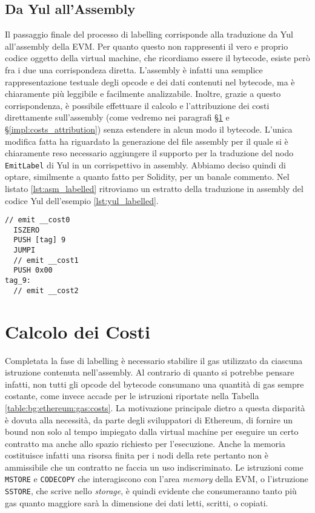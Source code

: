 \documentclass[12pt,a4paper,openright,oneside]{report}
\theoremstyle{definition}
\begin{document}
\subsection{Da Yul all'Assembly}\label{impl:lbl:evm}
Il passaggio finale del processo di labelling corrisponde alla traduzione da Yul all'assembly della EVM. Per quanto questo non rappresenti il vero e proprio codice oggetto della virtual machine, che ricordiamo essere il bytecode, esiste per\`{o} fra i due una corrispondeza diretta. L'assembly \`{e} infatti una semplice rappresentazione testuale degli opcode e dei dati contenuti nel bytecode, ma \`{e} chiaramente pi\`{u} leggibile e facilmente analizzabile. Inoltre, grazie a questo corrispondenza, \`{e} possibile effettuare il calcolo e l'attribuzione dei costi direttamente sull'assembly (come vedremo nei paragrafi \S\ref{impl:costs_calculation} e \S\ref{impl:costs_attribution}) senza estendere in alcun modo il bytecode. L'unica modifica fatta ha riguardato la generazione del file assembly per il quale si \`{e} chiaramente reso necessario aggiungere il supporto per la traduzione del nodo \texttt{EmitLabel} di Yul in un corrispettivo in assembly. Abbiamo deciso quindi di optare, similmente a quanto fatto per Solidity, per un banale commento. Nel listato \ref{lst:asm_labelled} ritroviamo un estratto della traduzione in assembly del codice Yul dell'esempio \ref{lst:yul_labelled}. 
\begin{lstlisting}[caption=Esempio di codice etichettato in Assembly,label={lst:asm_labelled},frame=tlrb]
  // emit __cost0
  ISZERO
  PUSH [tag] 9
  JUMPI
  // emit __cost1
  PUSH 0x00
tag_9:
  // emit __cost2
\end{lstlisting}

\section{Calcolo dei Costi}\label{impl:costs_calculation}
Completata la fase di labelling \`{e} necessario stabilire il gas utilizzato da ciascuna istruzione contenuta nell'assembly. Al contrario di quanto si potrebbe pensare infatti, non tutti gli opcode del bytecode consumano una  quantit\`{a} di gas sempre costante, come invece accade per le istruzioni riportate nella Tabella \ref{table:bg:ethereum:gas:costs}. La motivazione principale dietro a questa disparit\`{a} \`{e} dovuta alla necessit\`{a}, da parte degli sviluppatori di Ethereum, di fornire un bound non solo al tempo impiegato dalla virtual machine per eseguire un certo contratto ma anche allo spazio richiesto per l'esecuzione. Anche la memoria costituisce infatti una risorsa finita per i nodi della rete pertanto non \`{e} ammissibile che un contratto ne faccia un uso indiscriminato. Le istruzioni come \texttt{MSTORE} e \texttt{CODECOPY} che interagiscono con l'area \textit{memory} della EVM, o l'istruzione \texttt{SSTORE}, che scrive nello \textit{storage}, \`{e} quindi evidente che consumeranno tanto pi\`{u} gas quanto maggiore sar\`{a} la dimensione dei dati letti, scritti, o copiati.
\end{document}

